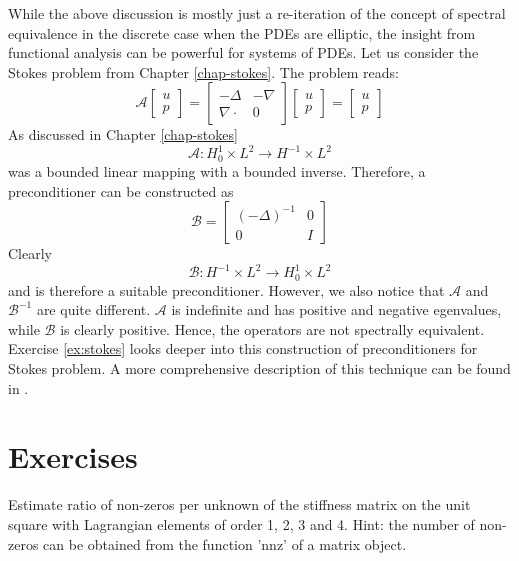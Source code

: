 While the above discussion is mostly just a re-iteration of the concept of spectral equivalence in the discrete case 
when the PDEs are elliptic, 
the insight from functional analysis can be powerful for systems of PDEs. 
Let us consider the Stokes problem from Chapter \ref{chap-stokes}.  
The problem reads: 
\[
\mathcal{A}  
\left[ 
\begin{array}{c}
u \\ p  
\end{array}
\right]
=
\left[ 
\begin{array}{cc}
-\Delta & -\nabla \\  
\nabla\cdot & 0  
\end{array}
\right]
\left[ 
\begin{array}{c}
u \\ p  
\end{array}
\right]
=
\left[ 
\begin{array}{c}
u \\ p  
\end{array}
\right]
\]
As discussed in Chapter \ref{chap-stokes} 
\[
\mathcal{A} : H^1_0 \times L^2 \rightarrow   H^{-1} \times L^2 
\]
was a bounded linear mapping with a bounded inverse.  
Therefore, a preconditioner can be constructed as 
\[
\mathcal{B}
= 
\left[ 
\begin{array}{cc}
(-\Delta)^{-1} & 0 \\  
0 & I  
\end{array}
\right]
\]
Clearly 
\[
\mathcal{B}:  H^{-1} \times L^2 \rightarrow H^1_0 \times L^2   
\]
and is therefore a suitable preconditioner. However, we also notice that
$\mathcal{A}$ and $\mathcal{B}^{-1}$ are quite different. 
$\mathcal{A}$ is indefinite and has positive and negative egenvalues, while
$\mathcal{B}$ is clearly positive. Hence, the operators are not spectrally equivalent.    
Exercise \ref{ex:stokes} looks deeper into this construction of preconditioners
for Stokes problem. A more comprehensive description of this technique
can be found in \cite{mardal2011preconditioning}.



\section{Exercises}

\begin{exercise}
\label{ex:nnz}
Estimate ratio of non-zeros per unknown of the stiffness matrix on the unit square   
with Lagrangian elements of order 1, 2, 3 and 4. Hint: the 
number of non-zeros can be obtained from the function 'nnz' of a matrix object.  
\end{exercise}

